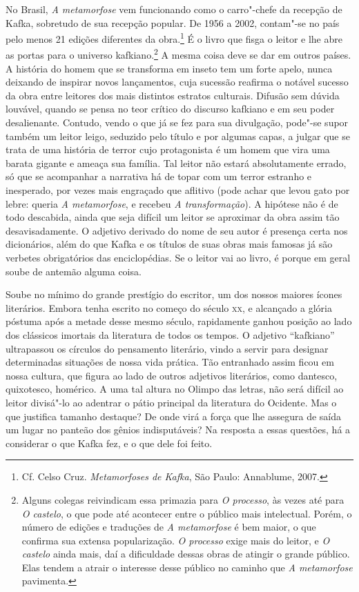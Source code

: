 No Brasil, \textit{A metamorfose} vem funcionando como o carro"-chefe
da recepção de Kafka, sobretudo de sua recepção popular. De 1956 a
2002, contam"-se no país pelo menos 21 edições diferentes da
obra.\footnote{ Cf. Celso Cruz. \textit{Metamorfoses de Kafka}, São
Paulo: Annablume, 2007.} É o livro que fisga o leitor e lhe abre as
portas para o universo kafkiano.\footnote{ Alguns colegas reivindicam
essa primazia para \textit{O processo}, às vezes até para \textit{O
castelo}, o que pode até acontecer entre o público mais intelectual.
Porém, o número de edições e traduções de \textit{A metamorfose} é bem
maior, o que confirma sua extensa popularização. \textit{O processo}
exige mais do leitor, e \textit{O castelo} ainda mais, daí a
dificuldade dessas obras de atingir o grande público. Elas tendem a
atrair o interesse desse público no caminho que \textit{A metamorfose}
pavimenta.} A mesma coisa deve se dar em outros países. A história do
homem que se transforma em inseto tem um forte apelo, nunca deixando de
inspirar novos lançamentos, cuja sucessão reafirma o notável sucesso da
obra entre leitores dos mais distintos estratos culturais. Difusão sem
dúvida louvável, quando se pensa no teor crítico do discurso kafkiano e
em seu poder desalienante. Contudo, vendo o que já se fez para sua
divulgação, pode"-se supor também um leitor leigo, seduzido pelo
título e por algumas capas, a julgar que se trata de uma história de
terror cujo protagonista é um homem que vira uma barata gigante e
ameaça sua família. Tal leitor não estará absolutamente errado, só que
se acompanhar a narrativa há de topar com um terror estranho e
inesperado, por vezes mais engraçado que aflitivo (pode achar que
levou gato por lebre: queria \textit{A metamorfose}, e recebeu
\textit{A transformação}). A hipótese não é de todo descabida, ainda
que seja difícil um leitor se aproximar da obra assim tão
desavisadamente. O adjetivo derivado do nome de seu autor é presença
certa nos dicionários, além do que Kafka e os títulos de suas obras
mais famosas já são verbetes obrigatórios das enciclopédias. Se o
leitor vai ao livro, é porque em geral soube de antemão alguma coisa.

Soube no mínimo do grande prestígio do escritor, um dos nossos maiores
ícones literários. Embora tenha escrito no começo do século \textsc{xx}, e
alcançado a glória póstuma após a metade desse mesmo século,
rapidamente ganhou posição ao lado dos clássicos imortais da literatura
de todos os tempos. O adjetivo “kafkiano” ultrapassou os círculos do
pensamento literário, vindo a servir para designar determinadas
situações de nossa vida prática. Tão entranhado assim ficou em nossa
cultura, que figura ao lado de outros adjetivos literários, como dantesco, quixotesco,
homérico. A uma tal altura no Olimpo das letras, não será difícil ao
leitor divisá"-lo ao adentrar o pátio principal da literatura do
Ocidente. Mas o que justifica tamanho destaque? De onde virá a força
que lhe assegura de saída um lugar no panteão dos gênios indisputáveis?
Na resposta a essas questões, há a considerar o que Kafka fez, e o que
dele foi feito.

